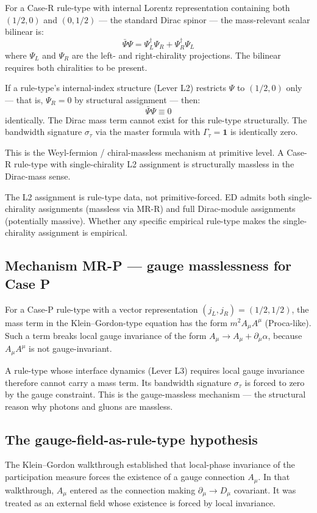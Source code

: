 \documentclass[11pt,a4paper]{article}
\begin{document}
For a Case-R rule-type with internal Lorentz representation containing both $(1/2, 0)$ and $(0, 1/2)$ --- the standard Dirac spinor --- the mass-relevant scalar bilinear is:
\[
\bar\Psi\Psi = \Psi_L^\dagger \Psi_R + \Psi_R^\dagger \Psi_L
\]
where $\Psi_L$ and $\Psi_R$ are the left- and right-chirality projections. The bilinear requires both chiralities to be present.

If a rule-type's internal-index structure (Lever L2) restricts $\Psi$ to $(1/2, 0)$ only --- that is, $\Psi_R = 0$ by structural assignment --- then:
\[
\bar\Psi\Psi \equiv 0
\]
identically. The Dirac mass term cannot exist for this rule-type structurally. The bandwidth signature $\sigma_\tau$ via the master formula with $\Gamma_\tau = \mathbf{1}$ is identically zero.

This is the Weyl-fermion / chiral-massless mechanism at primitive level. A Case-R rule-type with single-chirality L2 assignment is structurally massless in the Dirac-mass sense.

The L2 assignment is rule-type data, not primitive-forced. ED admits both single-chirality assignments (massless via MR-R) and full Dirac-module assignments (potentially massive). Whether any specific empirical rule-type makes the single-chirality assignment is empirical.

\subsection{Mechanism MR-P --- gauge masslessness for Case P}

For a Case-P rule-type with a vector representation $(j_L, j_R) = (1/2, 1/2)$, the mass term in the Klein--Gordon-type equation has the form $m^2 A_\mu A^\mu$ (Proca-like). Such a term breaks local gauge invariance of the form $A_\mu \to A_\mu + \partial_\mu\alpha$, because $A_\mu A^\mu$ is not gauge-invariant.

A rule-type whose interface dynamics (Lever L3) requires local gauge invariance therefore cannot carry a mass term. Its bandwidth signature $\sigma_\tau$ is forced to zero by the gauge constraint. This is the gauge-massless mechanism --- the structural reason why photons and gluons are massless.

\subsection{The gauge-field-as-rule-type hypothesis}

The Klein--Gordon walkthrough established that local-phase invariance of the participation measure forces the existence of a gauge connection $A_\mu$. In that walkthrough, $A_\mu$ entered as the connection making $\partial_\mu \to D_\mu$ covariant. It was treated as an external field whose existence is forced by local invariance.
\end{document}
